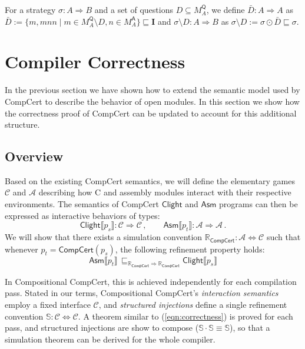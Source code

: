 \documentclass[acmsmall,timestamp,review,anonymous]{acmart}
\newcommand{\kw}[1]{\ensuremath{ \mathsf{#1} }}
\begin{document}
\begin{definition}[Hiding]
For a strategy $\sigma : A \Rightarrow B$ and
a set of questions $D \subseteq M_A^\kw{Q}$,
we define $\bar{D} : A \Rightarrow A$ as
$\bar{D} := \{ m, mnn \mid m \in M_A^\kw{Q} \setminus D, n \in M_A^\kw{A} \}
\sqsubseteq \mathbf{I}$
and $\sigma \setminus D : A \Rightarrow B$ as
$\sigma \setminus D := \sigma \odot \bar{D} \sqsubseteq \sigma$.
\end{definition}



\section{Compiler Correctness} \label{sec:compcert} %

In the previous section
we have shown how to extend
the semantic model used by CompCert
to describe the behavior of open modules.
In this section
we show how the correctness proof of CompCert
can be updated to account for this additional structure.

\subsection{Overview} \label{sec:compcert:overview} %

Based on the existing CompCert semantics,
we will define the elementary games
$\mathcal{C}$ and $\mathcal{A}$
describing how C and assembly modules
interact with their respective environments.
The semantics of CompCert $\kw{Clight}$ and $\kw{Asm}$ programs
can then be expressed as interactive behaviors of types:
\[
    \kw{Clight} \llbracket p_s \rrbracket :
      \mathcal{C} \Rightarrow \mathcal{C} \,, \qquad
    \kw{Asm} \llbracket p_t \rrbracket :
      \mathcal{A} \Rightarrow \mathcal{A} \,.
\]
We will show that there exists a simulation convention
$\mathbb{R}_\kw{CompCert} : \mathcal{A} \Leftrightarrow \mathcal{C}$
such that whenever $p_t = \kw{CompCert}(p_s)$,
the following refinement property holds:
\begin{equation}
    \label{eqn:correctness}
    \kw{Asm} \llbracket p_t \rrbracket \,
    \sqsubseteq_{\mathbb{R}_\kw{CompCert} \Rightarrow \mathbb{R}_\kw{CompCert}}
    \kw{Clight} \llbracket p_s \rrbracket
\end{equation}

In Compositional CompCert,
this is achieved independently for each compilation pass.
Stated in our terms,
Compositional CompCert's \emph{interaction semantics}
employ a fixed interface $\mathcal{C}$,
and \emph{structured injections} define a single refinement convention
$\mathbb{S} : \mathcal{C} \Leftrightarrow \mathcal{C}$.
A theorem similar to (\ref{eqn:correctness}) is proved for each pass,
and structured injections are show to compose
($\mathbb{S} \cdot \mathbb{S} \equiv \mathbb{S}$),
so that a simulation theorem can be derived for the whole compiler.
\end{document}
